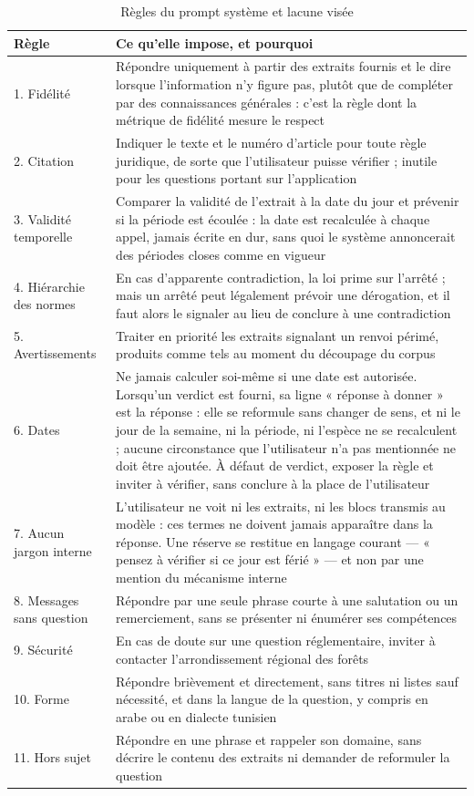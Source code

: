 \begin{table}[h]
\centering
\caption{Règles du prompt système et lacune visée}
\label{tab:regles-prompt}
\begin{tabular}{|p{3.4cm}|p{10.3cm}|}
\hline
\textbf{Règle} & \textbf{Ce qu'elle impose, et pourquoi} \\
\hline
1. Fidélité & Répondre uniquement à partir des extraits fournis et le dire
lorsque l'information n'y figure pas, plutôt que de compléter par des
connaissances générales : c'est la règle dont la métrique de fidélité mesure le
respect \\
\hline
2. Citation & Indiquer le texte et le numéro d'article pour toute règle
juridique, de sorte que l'utilisateur puisse vérifier ; inutile pour les
questions portant sur l'application \\
\hline
3. Validité temporelle & Comparer la validité de l'extrait à la date du jour et
prévenir si la période est écoulée : la date est recalculée à chaque appel,
jamais écrite en dur, sans quoi le système annoncerait des périodes closes comme
en vigueur \\
\hline
4. Hiérarchie des normes & En cas d'apparente contradiction, la loi prime sur
l'arrêté ; mais un arrêté peut légalement prévoir une dérogation, et il faut
alors le signaler au lieu de conclure à une contradiction \\
\hline
5. Avertissements & Traiter en priorité les extraits signalant un renvoi
périmé, produits comme tels au moment du découpage du corpus \\
\hline
6. Dates & Ne jamais calculer soi-même si une date est autorisée. Lorsqu'un
verdict est fourni, sa ligne « réponse à donner » est la réponse : elle se
reformule sans changer de sens, et ni le jour de la semaine, ni la période, ni
l'espèce ne se recalculent ; aucune circonstance que l'utilisateur n'a pas
mentionnée ne doit être ajoutée. À défaut de verdict, exposer la règle et
inviter à vérifier, sans conclure à la place de l'utilisateur \\
\hline
7. Aucun jargon interne & L'utilisateur ne voit ni les extraits, ni les blocs
transmis au modèle : ces termes ne doivent jamais apparaître dans la réponse.
Une réserve se restitue en langage courant — « pensez à vérifier si ce jour est
férié » — et non par une mention du mécanisme interne \\
\hline
8. Messages sans question & Répondre par une seule phrase courte à une
salutation ou un remerciement, sans se présenter ni énumérer ses compétences \\
\hline
9. Sécurité & En cas de doute sur une question réglementaire, inviter à
contacter l'arrondissement régional des forêts \\
\hline
10. Forme & Répondre brièvement et directement, sans titres ni listes sauf
nécessité, et dans la langue de la question, y compris en arabe ou en dialecte
tunisien \\
\hline
11. Hors sujet & Répondre en une phrase et rappeler son domaine, sans décrire
le contenu des extraits ni demander de reformuler la question \\
\hline
\end{tabular}
\end{table}

